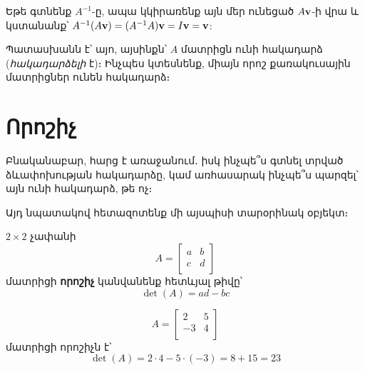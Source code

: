 Եթե գտնենք $A^{-1}$-ը, ապա կկիրառենք այն մեր ունեցած $A\mathbf{v}$-ի վրա և կստանանք՝ $A^{-1}(A\mathbf{v}) = (A^{-1}A)\mathbf{v}=I\mathbf{v} =\mathbf{v}$:



Պատասխանն է՝ այո, այսինքն՝ $A$ մատրիցն ունի հակադարձ (\textit{հակա\-դար\-ձելի} է)։ Ինչպես կտեսնենք, միայն որոշ քառակուսային մատրիցներ ունեն հակադարձ։



\section{Որոշիչ}

Բնականաբար, հարց է առաջանում․ իսկ ինչպե՞ս գտնել տրված ձևա\-փոխու\-թյան հակադարձը, կամ առհասարակ ինչպե՞ս պարզել՝ այն ունի հակադարձ, թե ոչ։ 

Այդ նպատակով հետազոտենք մի այսպիսի տարօրինակ օբյեկտ։

\begin{definition}
\(2 \times 2\) չափանի
\[
  A = \begin{bmatrix}
    a & b \\
    c & d \\
  \end{bmatrix}
\]
մատրիցի \textbf{որոշիչ} կանվանենք հետևյալ թիվը՝
\[
  \det(A) = ad - bc
\]
\end{definition}

\begin{example}
\[
  A = \begin{bmatrix}
    2 & 5 \\
    -3 & 4 \\
  \end{bmatrix}
\]
մատրիցի որոշիչն է՝ 
\[\det(A) = 2 \cdot 4 - 5 \cdot (-3) = 8+15=23\]
\end{example}

